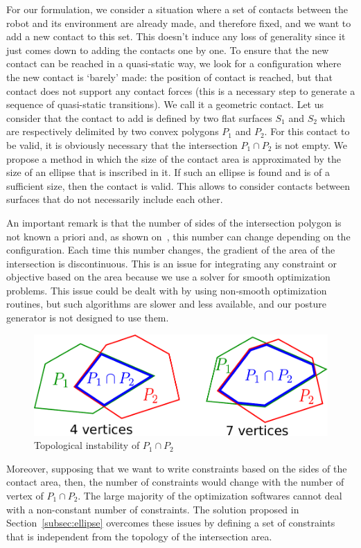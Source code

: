 For our formulation, we consider a situation where a set of contacts between the robot and its environment are already made, and therefore fixed, and we want to add a new contact to this set.
This doesn't induce any loss of generality since it just comes down to adding the contacts one by one.
To ensure that the new contact can be reached in a quasi-static way, we look for a configuration where the new contact is `barely' made: the position of contact is reached, but that contact does not support any contact forces (this is a necessary step to generate a sequence of quasi-static transitions).
We call it a geometric contact.
Let us consider that the contact to add is defined by two flat surfaces $S_1$ and $S_2$ which are respectively delimited by two convex polygons $P_1$ and $P_2$.
For this contact to be valid, it is obviously necessary that the intersection $P_1 \cap P_2$ is not empty.
We propose a method in which the size of the contact area is approximated by the size of an ellipse that is inscribed in it.
If such an ellipse is found and is of a sufficient size, then the contact is valid.
This allows to consider contacts between surfaces that do not necessarily include each other.

An important remark is that the number of sides of the intersection polygon is not known a priori and, as shown on~, this number can change depending on the configuration.
Each time this number changes, the gradient of the area of the intersection is discontinuous.
This is an issue for integrating any constraint or objective based on the area because we use a solver for smooth optimization problems.
This issue could be dealt with by using non-smooth optimization routines, but such algorithms are slower and less available, and our posture generator is not designed to use them.
\begin{figure}[!htb]
  \centering
  \includegraphics[width=0.4\columnwidth]{polygon-inter.pdf}
  \caption{Topological instability of $P_1 \cap P_2$}
\label{fig:polygon-inter}
\end{figure}
Moreover, supposing that we want to write constraints based on the sides of the contact area, then, the number of constraints would change with the number of vertex of $P_1 \cap P_2$.
The large majority of the optimization softwares cannot deal with a non-constant number of constraints.
The solution proposed in Section~\ref{subsec:ellipse} overcomes these issues by defining a set of constraints that is independent from the topology of the intersection area.

